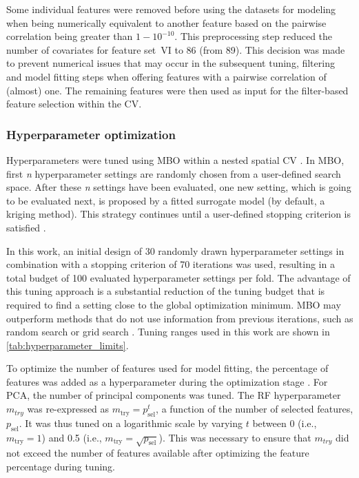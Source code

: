 \documentclass[remotesensing,article,submit,moreauthors,pdftex]{Definitions/mdpi}
\begin{document}
Some individual features were removed before using the datasets for modeling when being numerically equivalent to another feature based on the pairwise correlation being greater than $1 - 10^{-10}$.
This preprocessing step reduced the number of covariates for feature set~VI to 86 (from 89).
This decision was made to prevent numerical issues that may occur in the subsequent tuning, filtering and model fitting steps when offering features with a pairwise correlation of (almost) one.
The remaining features were then used as input for the filter-based feature selection within the CV.


\subsubsection{Hyperparameter optimization}

Hyperparameters were tuned using \ac{MBO} within a nested spatial \ac{CV} \cite{mlrmbo, binder2020, schratz2019}.
In MBO, first \textit{n} hyperparameter settings are randomly chosen from a user-defined search space.
After these \textit{n} settings have been evaluated, one new setting, which is going to be evaluated next, is proposed by a fitted surrogate model (by default, a kriging method).
This strategy continues until a user-defined stopping criterion is satisfied \cite{hutter2011, jones1998}.

In this work, an initial design of 30 randomly drawn hyperparameter settings in combination with a stopping criterion of 70 iterations was used, resulting in a total budget of 100 evaluated hyperparameter settings per fold.
The advantage of this tuning approach is a substantial reduction of the tuning budget that is required to find a setting close to the global optimization minimum.
\ac{MBO} may outperform methods that do not use information from previous iterations, such as random search or grid search \cite{bergstra2012}.
Tuning ranges used in this work are shown in \autoref{tab:hyperparameter_limits}.

To optimize the number of features used for model fitting, the percentage of features was added as a hyperparameter during the optimization stage \cite{binder2020}.
For \ac{PCA}, the number of principal components was tuned.
The RF hyperparameter \texttt{\(m_{try}\)} was re-expressed as $m_\textrm{try} = p_\textrm{sel}^t$, a function of the number of selected features, $p_\textrm{sel}$.
It was thus tuned on a logarithmic scale by varying $t$ between 0 (i.e., $m_\textrm{try} = 1$) and 0.5 (i.e., $m_\textrm{try}=\sqrt{p_\textrm{sel}}$).
This was necessary to ensure that \texttt{\(m_{try}\)} did not exceed the number of features available after optimizing the feature percentage during tuning.
\end{document}
